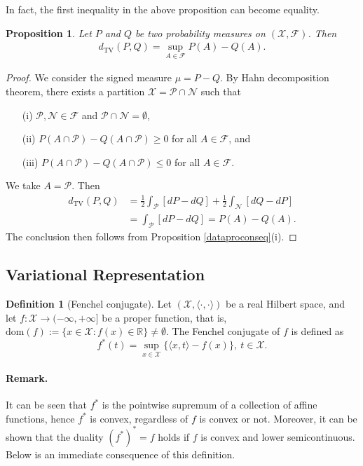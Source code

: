 \documentclass{article}
\numberwithin{equation}{section}
\renewcommand{\cal}{\mathcal}
\theoremstyle{plain}
\newtheorem{proposition}[theorem]{Proposition}
\theoremstyle{definition}
\newtheorem{definition}[theorem]{Definition}
\begin{document}
In fact, the first inequality in the above proposition can become equality.
\begin{proposition}\label{tvrepsup}
Let $P$ and $Q$ be two probability measures on $(\cal{X},\mathscr{F})$. Then
\begin{align*}
d_\mathrm{TV}(P,Q)=\sup_{A\in\mathscr{F}}P(A)-Q(A).	
\end{align*}
\end{proposition}
\begin{proof}
We consider the signed measure $\mu=P-Q$. By Hahn decomposition theorem, there exists a partition $\mathcal{X}=\mathcal{P}\cap\mathcal{N}$ such that
\begin{itemize}
\item[(i)] $\mathcal{P},\mathcal{N}\in\mathscr{F}$ and $\mathcal{P}\cap\mathcal{N}=\emptyset$, 
\item[(ii)] $P(A\cap\mathcal{P})-Q(A\cap\mathcal{P})\geq 0$ for all $A\in\mathscr{F}$, and 
\item[(iii)] $P(A\cap\mathcal{P})-Q(A\cap\mathcal{P})\leq 0$ for all $A\in\mathscr{F}$.
\end{itemize}
We take $A=\mathcal{P}$. Then
\begin{align*}
	d_{\mathrm{TV}}(P,Q)&=\frac{1}{2}\int_{\cal{P}}[dP-dQ]+\frac{1}{2}\int_{\cal{N}}[dQ-dP]\\
	&=\int_{\cal{P}}[dP-dQ]=P(A)-Q(A).
\end{align*}
The conclusion then follows from Proposition \ref{dataproconseq}(i).
\end{proof}

\subsection{Variational Representation}
\begin{definition}[Fenchel conjugate] Let $(\mathcal{X},\langle\cdot,\cdot\rangle)$ be a real Hilbert space, and let $f:\mathcal{X}\to(-\infty,+\infty]$ be a proper function, that is, $\mathrm{dom}(f):=\{x\in\mathcal{X}:f(x)\in\mathbb{R}\}\neq\emptyset.$
The Fenchel conjugate of $f$ is defined as
\begin{equation}
	f^*(t) = \sup_{x\in\mathcal{X}} \{\langle x,t\rangle - f(x)\},\ t\in\mathcal{X}.\label{fencheldual}
\end{equation}
\end{definition}

\paragraph{Remark.} It can be seen that $f^*$ is the pointwise supremum of a collection of affine functions, hence $f^*$ is convex, regardless of $f$ is convex or not. Moreover, it can be shown that the duality $(f^*)^*=f$ holds if $f$ is convex and lower semicontinuous. Below is an immediate consequence of this definition. 
\end{document}
